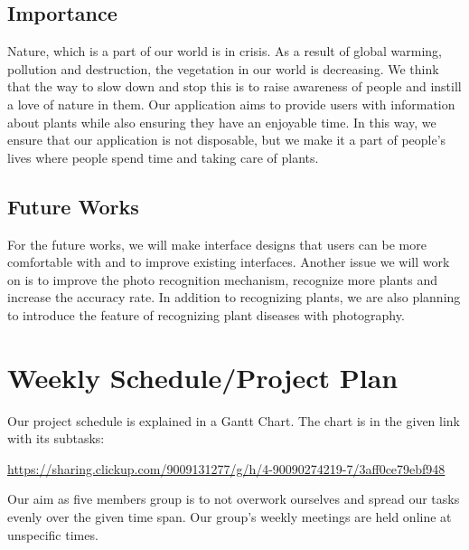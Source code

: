 \documentclass[conference]{IEEEtran}
\begin{document}
\subsection{Importance}
 Nature, which is a part of our world is in crisis. As a result of global warming, pollution and destruction, the vegetation in our world is decreasing. We think that the way to slow down and stop this is to raise awareness of people and instill a love of nature in them. Our application aims to provide users with information about plants while also ensuring they have an enjoyable time. In this way, we ensure that our application is not disposable, but we make it a part of people's lives where people spend time and taking care of plants. \newline

\subsection{Future Works}
 For the future works, we will make interface designs that users can be more comfortable with and to improve existing interfaces. Another issue we will work on is to improve the photo recognition mechanism, recognize more plants and increase the accuracy rate. In addition to recognizing plants, we are also planning to introduce the feature of recognizing plant diseases with photography.

\section{Weekly Schedule/Project Plan}

Our project schedule is explained in a Gantt Chart. The chart is in the given link with its subtasks: 


\url{https://sharing.clickup.com/9009131277/g/h/4-90090274219-7/3aff0ce79ebf948}


Our aim as five members group is to not overwork ourselves and spread our tasks evenly over the given time span. Our group’s weekly meetings are held online at unspecific times.
\end{document}
